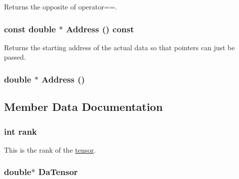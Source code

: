 Returns the opposite of operator==. \hypertarget{classJKBuilder_1_1tensor_a6a4e024f566d3bf9ba32a349afc5bbcf}{
\subsubsection[{Address}]{\setlength{\rightskip}{0pt plus 5cm}const double $\ast$ Address () const}}
\label{classJKBuilder_1_1tensor_a6a4e024f566d3bf9ba32a349afc5bbcf}


Returns the starting address of the actual data so that pointers can just be passed. \hypertarget{classJKBuilder_1_1tensor_ac982d9eb84092bfc13694448dd824cbc}{
\subsubsection[{Address}]{\setlength{\rightskip}{0pt plus 5cm}double $\ast$ Address ()}}
\label{classJKBuilder_1_1tensor_ac982d9eb84092bfc13694448dd824cbc}


\subsection{Member Data Documentation}
\hypertarget{classJKBuilder_1_1tensor_a6cfd95afd0afebd625b889fb6e58371c}{
\subsubsection[{rank}]{\setlength{\rightskip}{0pt plus 5cm}int {\bf rank}}}
\label{classJKBuilder_1_1tensor_a6cfd95afd0afebd625b889fb6e58371c}


This is the rank of the \hyperlink{classJKBuilder_1_1tensor}{tensor}. \hypertarget{classJKBuilder_1_1tensor_a91f7b1e58c0e5d1a49ddb8b80ab7790e}{
\subsubsection[{DaTensor}]{\setlength{\rightskip}{0pt plus 5cm}double$\ast$ {\bf DaTensor}}}
\label{classJKBuilder_1_1tensor_a91f7b1e58c0e5d1a49ddb8b80ab7790e}


